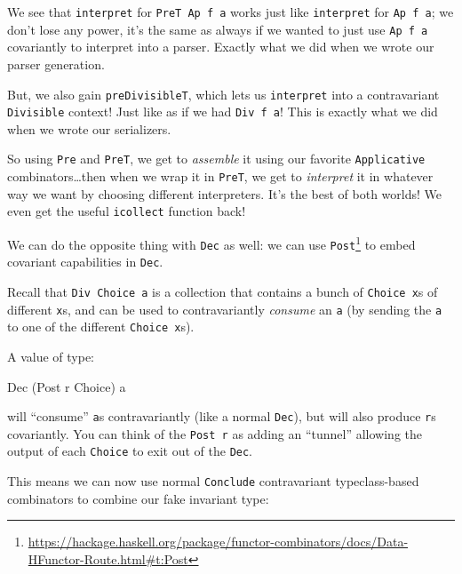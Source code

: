 \documentclass[]{article}
\newenvironment{Shaded}{}{}
\newcommand{\DataTypeTok}[1]{\textcolor[rgb]{0.56,0.13,0.00}{#1}}
\newcommand{\NormalTok}[1]{#1}
\renewcommand{\href}[2]{#2\footnote{\url{#1}}}
\begin{document}
We see that \texttt{interpret} for \texttt{PreT\ Ap\ f\ a} works just like
\texttt{interpret} for \texttt{Ap\ f\ a}; we don't lose any power, it's the same
as always if we wanted to just use \texttt{Ap\ f\ a} covariantly to interpret
into a parser. Exactly what we did when we wrote our parser generation.

But, we also gain \texttt{preDivisibleT}, which lets us \texttt{interpret} into
a contravariant \texttt{Divisible} context! Just like as if we had
\texttt{Div\ f\ a}! This is exactly what we did when we wrote our serializers.

So using \texttt{Pre} and \texttt{PreT}, we get to \emph{assemble} it using our
favorite \texttt{Applicative} combinators\ldots then when we wrap it in
\texttt{PreT}, we get to \emph{interpret} it in whatever way we want by choosing
different interpreters. It's the best of both worlds! We even get the useful
\texttt{icollect} function back!

We can do the opposite thing with \texttt{Dec} as well: we can use
\href{https://hackage.haskell.org/package/functor-combinators/docs/Data-HFunctor-Route.html\#t:Post}{\texttt{Post}}
to embed covariant capabilities in \texttt{Dec}.

Recall that \texttt{Div\ Choice\ a} is a collection that contains a bunch of
\texttt{Choice\ x}s of different \texttt{x}s, and can be used to contravariantly
\emph{consume} an \texttt{a} (by sending the \texttt{a} to one of the different
\texttt{Choice\ x}s).

A value of type:

\begin{Shaded}
\begin{Highlighting}[]
\DataTypeTok{Dec}\NormalTok{ (}\DataTypeTok{Post}\NormalTok{ r }\DataTypeTok{Choice}\NormalTok{) a}
\end{Highlighting}
\end{Shaded}

will ``consume'' \texttt{a}s contravariantly (like a normal \texttt{Dec}), but
will also produce \texttt{r}s covariantly. You can think of the \texttt{Post\ r}
as adding an ``tunnel'' allowing the output of each \texttt{Choice} to exit out
of the \texttt{Dec}.

This means we can now use normal \texttt{Conclude} contravariant typeclass-based
combinators to combine our fake invariant type:
\end{document}
